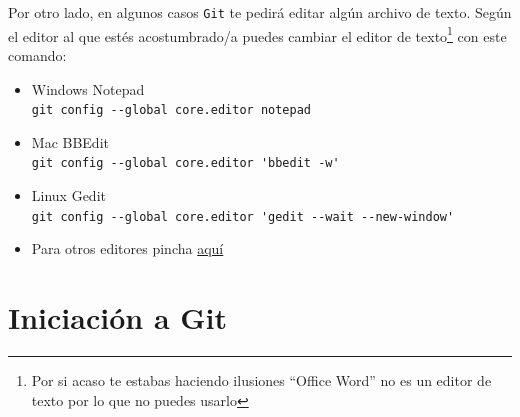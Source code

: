 \documentclass[a4paper,11pt]{report}
\newcommand{\cverb}{\Verb}
\begin{document}
    Por otro lado, en algunos casos \verb+Git+ te pedirá editar algún archivo de texto. Según el editor al que estés acostumbrado/a puedes cambiar el editor de texto\footnote{Por si acaso te estabas haciendo ilusiones ``Office Word'' no es un editor de texto por lo que no puedes usarlo} con este comando:
    
    \begin{itemize}
     \item Windows Notepad\\ \cverb+git config --global core.editor notepad+
     \item Mac BBEdit\\ \cverb+git config --global core.editor 'bbedit -w'+
     \item Linux Gedit\\ \cverb+git config --global core.editor 'gedit --wait --new-window'+
     \item Para otros editores pincha \href{https://git-scm.com/book/en/v2/Appendix-C%3A-Git-Commands-Setup-and-Config}{aquí}
    \end{itemize}

  \chapter{Iniciación a Git}
\end{document}
